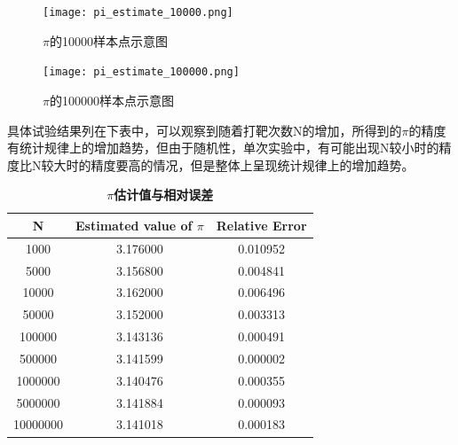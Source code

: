 \documentclass[12pt,a4paper]{article}%
\begin{document}
\begin{figure}[H]%
    \centering
    \begin{minipage}{0.48\textwidth}
        \centering
        \texttt{[image: pi\_estimate\_10000.png]}
        \caption{\fontsize{10pt}{15pt}\selectfont $\pi$的10000样本点示意图}
    \end{minipage}
    \hspace{0cm}%
    \hfill%
    \begin{minipage}{0.48\textwidth}
        \centering
        \texttt{[image: pi\_estimate\_100000.png]}
        \caption{\fontsize{10pt}{15pt}\selectfont $\pi$的100000样本点示意图}
    \end{minipage}\label{fig:figure2}
\end{figure}

具体试验结果列在下表中，可以观察到随着打靶次数N的增加，所得到的$\pi$的精度有统计规律上的增加趋势，但由于随机性，单次实验中，有可能出现N较小时的精度比N较大时的精度要高的情况，但是整体上呈现统计规律上的增加趋势。

\begin{table}[H]
    \caption{\textbf{$\pi$估计值与相对误差}}%
    \centering%
    \begin{tabular}{ccc}%
        \toprule%
        N        & Estimated value of $\pi$ & Relative Error \\
        \midrule%
        1000     & 3.176000                 & 0.010952       \\
        5000     & 3.156800                 & 0.004841       \\
        10000    & 3.162000                 & 0.006496       \\
        50000    & 3.152000                 & 0.003313       \\
        100000   & 3.143136                 & 0.000491       \\
        500000   & 3.141599                 & 0.000002       \\
        1000000  & 3.140476                 & 0.000355       \\
        5000000  & 3.141884                 & 0.000093       \\
        10000000 & 3.141018                 & 0.000183       \\
        \bottomrule      %
    \end{tabular}
\end{table}
\end{document}
